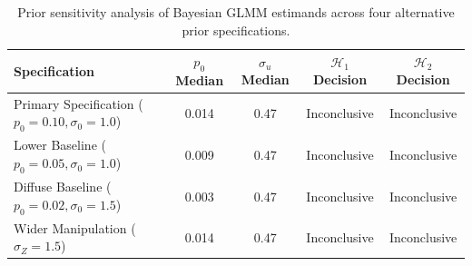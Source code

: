 \begin{table}[!ht]\centering\footnotesize
\caption{Prior sensitivity analysis of Bayesian GLMM estimands across four alternative prior specifications.}\label{tab:prior-sensitivity}
\begin{tabularx}{\columnwidth}{@{}p{} c c c c@{}}\toprule
Specification & $p_0$ Median & $\sigma_u$ Median & $\mathcal{H}_1$ Decision & $\mathcal{H}_2$ Decision \\
\midrule
Primary Specification ($p_0=0.10, \sigma_0=1.0$) & 0.014 & 0.47 & Inconclusive & Inconclusive \\
Lower Baseline ($p_0=0.05, \sigma_0=1.0$) & 0.009 & 0.47 & Inconclusive & Inconclusive \\
Diffuse Baseline ($p_0=0.02, \sigma_0=1.5$) & 0.003 & 0.47 & Inconclusive & Inconclusive \\
Wider Manipulation ($\sigma_Z=1.5$) & 0.014 & 0.47 & Inconclusive & Inconclusive \\
\bottomrule\end{tabularx}
\end{table}

